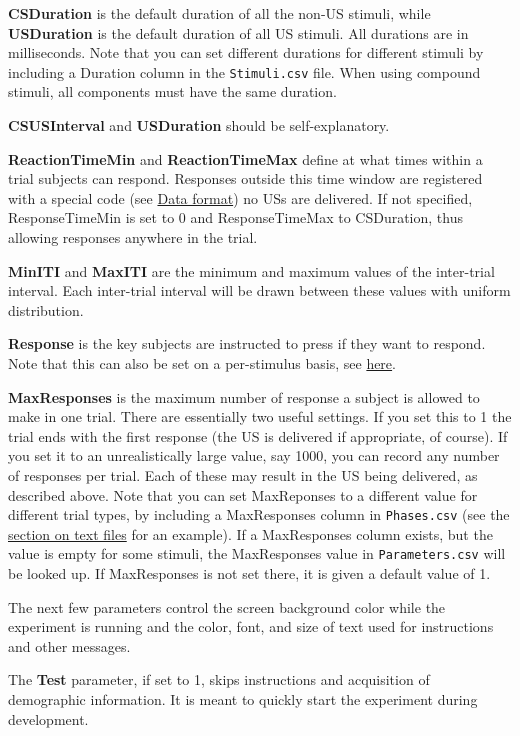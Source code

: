 \documentclass[11pt,]{article}
\begin{document}
\textbf{CSDuration} is the default duration of all the non-US stimuli,
while \textbf{USDuration} is the default duration of all US stimuli. All
durations are in milliseconds. Note that you can set different durations
for different stimuli by including a Duration column in the
\texttt{Stimuli.csv} file. When using compound stimuli, all components
must have the same duration.

\textbf{CSUSInterval} and \textbf{USDuration} should be
self-explanatory.

\textbf{ReactionTimeMin} and \textbf{ReactionTimeMax} define at what
times within a trial subjects can respond. Responses outside this time
window are registered with a special code (see
\hyperref[data-format]{Data format}) no USs are delivered. If not
specified, ResponseTimeMin is set to 0 and ResponseTimeMax to
CSDuration, thus allowing responses anywhere in the trial.

\textbf{MinITI} and \textbf{MaxITI} are the minimum and maximum values
of the inter-trial interval. Each inter-trial interval will be drawn
between these values with uniform distribution.

\textbf{Response} is the key subjects are instructed to press if they
want to respond. Note that this can also be set on a per-stimulus basis,
see \hyperref[responses]{here}.

\textbf{MaxResponses} is the maximum number of response a subject is
allowed to make in one trial. There are essentially two useful settings.
If you set this to 1 the trial ends with the first response (the US is
delivered if appropriate, of course). If you set it to an
unrealistically large value, say 1000, you can record any number of
responses per trial. Each of these may result in the US being delivered,
as described above. Note that you can set MaxReponses to a different
value for different trial types, by including a MaxResponses column in
\texttt{Phases.csv} (see the \hyperref[textfiles]{section on text files}
for an example). If a MaxResponses column exists, but the value is empty
for some stimuli, the MaxResponses value in \texttt{Parameters.csv} will
be looked up. If MaxResponses is not set there, it is given a default
value of 1.

The next few parameters control the screen background color while the
experiment is running and the color, font, and size of text used for
instructions and other messages.

The \textbf{Test} parameter, if set to 1, skips instructions and
acquisition of demographic information. It is meant to quickly start the
experiment during development.
\end{document}
